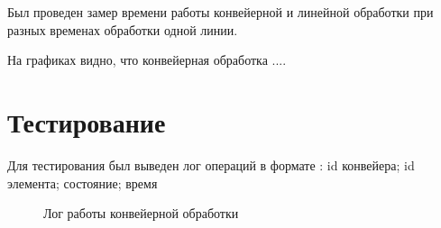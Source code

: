 \documentclass[12pt]{report}
\begin{document}
Был проведен замер времени работы конвейерной и линейной обработки при разных временах обработки одной линии.



На графиках видно, что конвейерная обработка ....

\section{Тестирование}
Для тестирования был выведен лог операций в формате : 
id конвейера; id элемента; состояние; время

\begin{figure}[h]
	\caption{Лог работы конвейерной обработки}
	\label{fig:v_st}
\end{figure}
\end{document}
